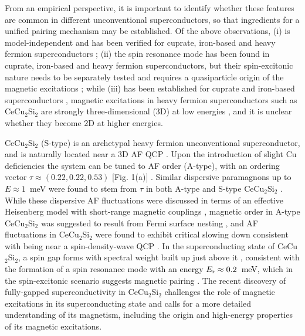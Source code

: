 \documentclass[aps,prl,onecolumn,amsmath,amssymb,superscriptaddress]{revtex4}
\newcommand{\ys}{\textcolor{black}}
\begin{document}
From an empirical perspective, it is important to identify whether these features are common in different unconventional superconductors, so that ingredients for a unified pairing mechanism may be established. 
Of the above observations, (i) is model-independent and has been verified for cuprate, iron-based and heavy fermion superconductors \cite{ EDemler1998,HWoo2006,CStock2008,OStockert2011,MWang2013,JLeiner2014,SCarr2016,TDahm2009}; (ii) the spin resonance mode has been found in cuprate, iron-based and heavy fermion superconductors, but their spin-excitonic nature needs to be separately tested and requires a quasiparticle origin of the magnetic excitations \cite{DJScalapino2012,MEschrig2006,GYu2009}; while (iii) \ys{has} been established for cuprate and iron-based superconductors \cite{RJBirgeneau2006,OJLipscombe2007,MFujita2012,MLeTacon2011,MLeTacon2013,MPMDean2013,MLiu2012,KJZhou2013,MWang2013}, magnetic excitations in heavy fermion superconductors such as CeCu$_2$Si$_2$ are strongly three-dimensional (3D) at low energies \cite{OStockert2011}, and it is unclear whether they become 2D at higher energies.

CeCu$_2$Si$_2$ (S-type) is an archetypal heavy fermion unconventional superconductor, and is naturally located near a 3D AF QCP \cite{PGegenwart1998,JArndt2011}. Upon the introduction of slight Cu deficiencies the system can be tuned to AF order (A-type), with an ordering vector $\tau\approx(0.22,0.22,0.53)$ [Fig. 1(a)] \cite{OStockert2004}. Similar dispersive paramagnons up to $E\approx1$~meV were found to stem from $\tau$ in both A-type and S-type CeCu$_2$Si$_2$ \cite{OStockert2011,ZHuesges2018}.
While these dispersive AF fluctuations were discussed in terms of an effective Heisenberg model with short-range magnetic couplings \cite{OStockert2011}, magnetic order in A-type CeCu$_2$Si$_2$ was suggested to result from Fermi surface nesting \cite{OStockert2004}, and AF fluctuations in CeCu$_2$Si$_2$ were found to exhibit critical slowing down consistent with being near a spin-density-wave QCP \cite{JArndt2011}. In the superconducting state of CeCu$_2$Si$_2$, a spin gap forms with spectral weight built up just above it \cite{OStockert2011}, consistent with the formation of a spin resonance mode \ys{with an energy $E_{\rm r}\approx0.2$~meV}, which in the spin-excitonic scenario suggests magnetic pairing \cite{IEremin2008}. The recent discovery of fully-gapped superconductivity in CeCu$_2$Si$_2$ \cite{SKittaka2014,SKittaka2016,TYamashita2017,TTakenaka2017,HIkeda2015,GPang2017,YLi2018,RTazai2018,RTazai2019} challenges the role of magnetic excitations in its superconducting state and calls for a more detailed understanding of its magnetism, including the origin and high-energy properties of its magnetic excitations.  
\end{document}
